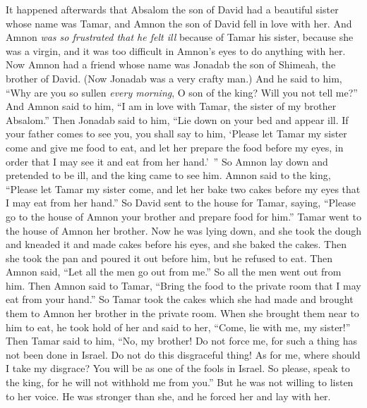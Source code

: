 \begin{biblechapter} %
 It happened afterwards that Absalom the son of David had a beautiful sister whose name was Tamar, and Amnon the son of David fell in love with her.
\verse And Amnon \textit{was so frustrated that he felt ill} because of Tamar his sister, because she was a virgin, and it was too difficult in Amnon’s eyes to do anything with her.
\verse Now Amnon had a friend whose name was Jonadab the son of Shimeah, the brother of David. (Now Jonadab was a very crafty man.)
\verse And he said to him, “Why are you so sullen \textit{every morning}, O son of the king? Will you not tell me?” And Amnon said to him, “I am in love with Tamar, the sister of my brother Absalom.”
\verse Then Jonadab said to him, “Lie down on your bed and appear ill. If your father comes to see you, you shall say to him, ‘Please let Tamar my sister come and give me food to eat, and let her prepare the food before my eyes, in order that I may see it and eat from her hand.’ ”
\verse So Amnon lay down and pretended to be ill, and the king came to see him. Amnon said to the king, “Please let Tamar my sister come, and let her bake two cakes before my eyes that I may eat from her hand.”
\verse So David sent to the house for Tamar, saying, “Please go to the house of Amnon your brother and prepare food for him.”
\verse Tamar went to the house of Amnon her brother. Now he was lying down, and she took the dough and kneaded it and made cakes before his eyes, and she baked the cakes.
\verse Then she took the pan and poured it out before him, but he refused to eat. Then Amnon said, “Let all the men go out from me.” So all the men went out from him.
\verse Then Amnon said to Tamar, “Bring the food to the private room that I may eat from your hand.” So Tamar took the cakes which she had made and brought them to Amnon her brother in the private room.
\verse When she brought them near to him to eat, he took hold of her and said to her, “Come, lie with me, my sister!”
\verse Then Tamar said to him, “No, my brother! Do not force me, for such a thing has not been done in Israel. Do not do this disgraceful thing!
\verse As for me, where should I take my disgrace? You will be as one of the fools in Israel. So please, speak to the king, for he will not withhold me from you.”
\verse But he was not willing to listen to her voice. He was stronger than she, and he forced her and lay with her.

\end{biblechapter}
